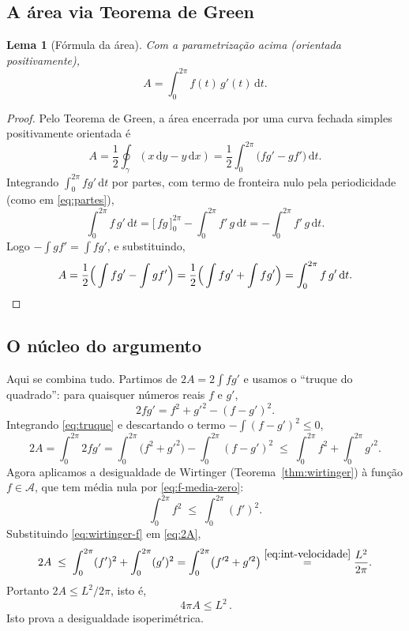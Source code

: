 \documentclass[11pt,a4paper]{amsart}
\renewcommand{\d}{\mathrm{d}}
\newcommand{\Adm}{\mathcal{A}}
\theoremstyle{plain}
\newtheorem{lema}[teorema]{Lema}
\theoremstyle{definition}
\theoremstyle{remark}
\begin{document}
\subsection{A \'area via Teorema de Green}

\begin{lema}[F\'ormula da \'area]\label{lema:area}
Com a parametriza\c{c}\~ao acima (orientada positivamente),
\[
  A = \int_0^{2\pi} f(t)\,g'(t)\,\d t .
\]
\end{lema}

\begin{proof}
Pelo Teorema de Green, a \'area encerrada por uma curva fechada simples
positivamente orientada \'e
\[
  A = \frac12\oint_\gamma (x\,\d y - y\,\d x)
    = \frac12\int_0^{2\pi}\big(f g' - g f'\big)\,\d t .
\]
Integrando $\int_0^{2\pi} f g'\,\d t$ por partes, com termo de fronteira nulo
pela periodicidade (como em \eqref{eq:partes}),
\[
  \int_0^{2\pi} f\,g'\,\d t
  = \big[\,f g\,\big]_0^{2\pi} - \int_0^{2\pi} f'\,g\,\d t
  = - \int_0^{2\pi} f'\,g\,\d t .
\]
Logo $-\int g f' = \int f g'$, e substituindo,
\[
  A = \frac12\Big(\int f g' - \int g f'\Big)
    = \frac12\Big(\int f g' + \int f g'\Big)
    = \int_0^{2\pi} f\,g'\,\d t . \qedhere
\]
\end{proof}

\subsection{O n\'ucleo do argumento}

Aqui se combina tudo. Partimos de $2A=2\int fg'$ e usamos o ``truque do
quadrado'': para quaisquer n\'umeros reais $f$ e $g'$,
\begin{equation}\label{eq:truque}
  2fg' = f^2 + g'^2 - (f - g')^2 .
\end{equation}
Integrando \eqref{eq:truque} e descartando o termo $-\int (f-g')^2\le 0$,
\begin{equation}\label{eq:2A}
  2A = \int_0^{2\pi} 2 f g'
     = \int_0^{2\pi}\!\big(f^2 + g'^2\big) - \int_0^{2\pi}(f-g')^2
     \;\le\; \int_0^{2\pi} f^2 + \int_0^{2\pi} g'^2 .
\end{equation}
Agora aplicamos a desigualdade de Wirtinger (Teorema~\ref{thm:wirtinger}) \`a
fun\c{c}\~ao $f\in\Adm$, que tem m\'edia nula por \eqref{eq:f-media-zero}:
\begin{equation}\label{eq:wirtinger-f}
  \int_0^{2\pi} f^2 \;\le\; \int_0^{2\pi} (f')^2 .
\end{equation}
Substituindo \eqref{eq:wirtinger-f} em \eqref{eq:2A},
\[
  2A \;\le\; \int_0^{2\pi}(f')^2 + \int_0^{2\pi}(g')^2
      = \int_0^{2\pi}\!\big(f'^2 + g'^2\big)
      \overset{\eqref{eq:int-velocidade}}{=} \frac{L^2}{2\pi} .
\]
Portanto $2A\le L^2/2\pi$, isto \'e,
\[
  \boxed{\,4\pi A \le L^2\,}.
\]
Isto prova a desigualdade isoperim\'etrica.
\end{document}
